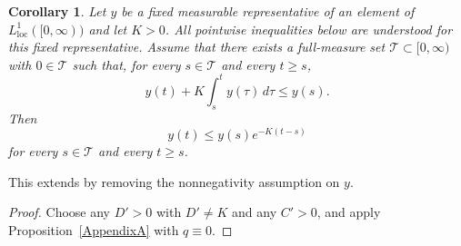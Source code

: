 \documentclass[11pt,reqno]{amsart}
\theoremstyle{plain}
\newtheorem{corollary}[thm]{Corollary}
\numberwithin{equation}{section}
\begin{document}
\begin{corollary}\label{Acoro}
Let {$y$ be a fixed measurable representative of an element
of \(L^1_{\mathrm{loc}}([0,\infty))\)} and let $K>0$.
{All pointwise inequalities below are understood for this
fixed representative.} Assume that there exists a full-measure set $\mathcal T\subset[0,\infty)$ with $0\in\mathcal T$ such that, for every $s\in\mathcal T$ and every $t\ge s$,
\[
y(t)+K\int_s^t y(\tau)\,d\tau\le y(s).
\]
Then
\[
y(t)\le y(s)e^{-K(t-s)}
\]
for every $s\in\mathcal T$ and every $t\ge s$.
\end{corollary}
This extends \cite[Proposition~A.1]{Kelliher2025} by removing the nonnegativity assumption on $y$.
\begin{proof}
Choose any $D'>0$ with $D'\neq K$ and any $C'>0$, and apply Proposition~\ref{AppendixA} with $q\equiv0$.
\end{proof}



\end{document}
